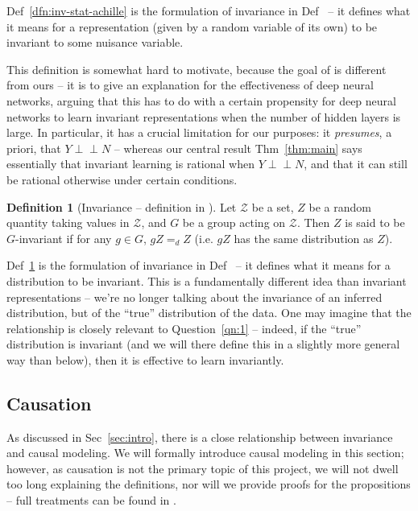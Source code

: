 \documentclass[12pt]{article}
\newcommand{\ci}{\perp\!\!\!\perp}
\theoremstyle{definition}
\newtheorem{dfn}[thm]{Definition}
\numberwithin{equation}{section}
\numberwithin{figure}{section}
\numberwithin{table}{section}
\begin{document}
Def~\ref{dfn:inv-stat-achille} is the formulation of invariance in Def~\cite{achille} -- it defines what it means for a representation (given by a random variable of its own) to be invariant to some nuisance variable. 

This definition is somewhat hard to motivate, because the goal of \cite{achille} is different from ours -- it is to give an explanation for the effectiveness of deep neural networks, arguing that this has to do with a certain propensity for deep neural networks to learn invariant representations when the number of hidden layers is large. In particular, it has a crucial limitation for our purposes: it \emph{presumes}, a priori, that $Y\ci N$ -- whereas our central result Thm~\ref{thm:main} says essentially that invariant learning is rational when $Y\ci N$, and that it can still be rational otherwise under certain conditions. 

\begin{dfn}[Invariance -- definition in \cite{sxchen}]
    \label{dfn:inv-stat-sxchen}
    Let $\mathcal{Z}$ be a set, $Z$ be a random quantity taking values in $\mathcal{Z}$, and $G$ be a group acting on $\mathcal{Z}$. Then $Z$ is said to be $G$-invariant if  for any $g\in G$, $gZ =_d Z$ (i.e. $gZ$ has the same distribution as $Z$).
\end{dfn}

Def~\ref{dfn:inv-stat-sxchen} is the formulation of invariance in Def~\cite{sxchen} -- it defines what it means for a distribution to be invariant. This is a fundamentally different idea than invariant representations -- we're no longer talking about the invariance of an inferred distribution, but of the ``true'' distribution of the data. One may imagine that the relationship is closely relevant to Question~\ref{qn:1} -- indeed, if the ``true'' distribution is invariant (and we will there define this in a slightly more general way than below), then it is effective to learn invariantly. 

\subsection{Causation}
\label{sec:cause}

As discussed in Sec~\ref{sec:intro}, there is a close relationship between invariance and causal modeling. We will formally introduce causal modeling in this section; however, as causation is not the primary topic of this project, we will not dwell too long explaining the definitions, nor will we provide proofs for the propositions -- full treatments can be found in \cite{pearl, elements}.
\end{document}
